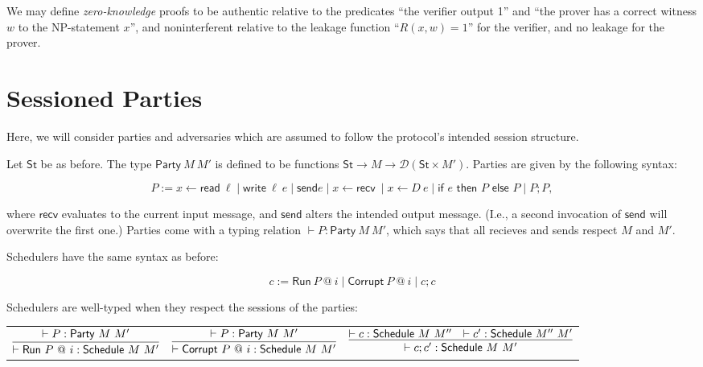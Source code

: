 \documentclass{article}
\newcommand{\St}{\mathsf{St}}
\newcommand{\D}{\mathcal{D}}
\newcommand{\Read}{\mathsf{read}}
\newcommand{\Write}{\mathsf{write}}
\newcommand{\send}{\mathsf{send}}
\newcommand{\recv}{\mathsf{recv}}
\begin{document}
We may define \emph{zero-knowledge} proofs to be authentic relative to the predicates ``the verifier output 1'' and ``the prover has a correct witness $w$ to the NP-statement $x$'', and noninterferent relative to the leakage function ``$R(x,w) = 1$'' for the verifier, and no leakage for the prover. 


\section{Sessioned Parties}

Here, we will consider parties and adversaries which are assumed to follow the protocol's intended session structure. 

Let $\St$ be as before. The type $\mathsf{Party}\ M\ M'$ is defined to be functions $\St \to M \to \D(\St \times M')$. Parties are given by the following syntax:

\[ P := x \leftarrow \Read\ \ell \mid \Write\ \ell\ e \mid \send e \mid x \leftarrow \recv\ \mid x \leftarrow D\ e \mid \textsf{if } e \textsf{ then } P \textsf{ else } P \mid P; P, \]

where $\recv$ evaluates to the current input message, and $\send$ alters the intended output message. (I.e., a second invocation of $\send$ will overwrite the first one.) Parties come with a typing relation $\vdash P : \mathsf{Party}\ M\ M'$, which says that all recieves and sends respect $M$ and $M'$.


Schedulers have the same syntax as before:

\[ c := \textsf{Run}\ P\ @\ i \mid \textsf{Corrupt}\ P\ @\ i \mid c; c\]

Schedulers are well-typed when they respect the sessions of the parties:

\begin{tabular}{ccc}
    $\infer{\vdash \textsf{Run}\ P\ @\ i : \textsf{Schedule}\ M\ M'}{\vdash P : \mathsf{Party}\ M\ M'}$ &
    $\infer{\vdash \textsf{Corrupt}\ P\ @\ i : \textsf{Schedule}\ M\ M'}{\vdash P : \mathsf{Party}\ M\ M'}$ &
    $\infer{\vdash c; c' : \textsf{Schedule}\ M\ M'}{\vdash c : \textsf{Schedule}\ M\ M'' & \vdash c' : \textsf{Schedule}\ M''\ M'}$ \\
\end{tabular}
\end{document}
